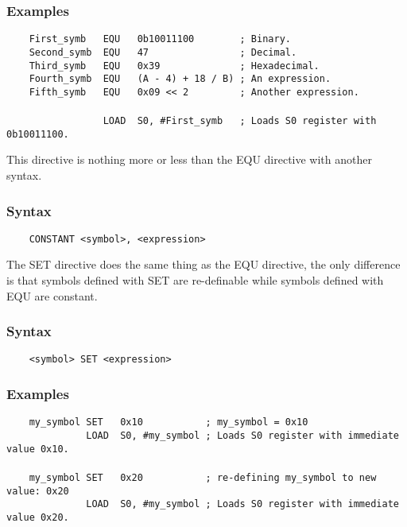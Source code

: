     \subsubsection{Examples}
        \verb'    First_symb   EQU   0b10011100        ; Binary.'\\
        \verb'    Second_symb  EQU   47                ; Decimal.'\\
        \verb'    Third_symb   EQU   0x39              ; Hexadecimal.'\\
        \verb'    Fourth_symb  EQU   (A - 4) + 18 / B) ; An expression.'\\
        \verb'    Fifth_symb   EQU   0x09 << 2         ; Another expression.'\\
        \verb''\\
        \verb'                 LOAD  S0, #First_symb   ; Loads S0 register with 0b10011100.'

    This directive is nothing more or less than the EQU directive with another syntax.

    \subsubsection{Syntax}
        \verb'    CONSTANT <symbol>, <expression>'

    The SET directive does the same thing as the EQU directive, the only difference is that symbols defined with SET are re-definable while symbols defined with EQU are constant.

    \subsubsection{Syntax}
        \verb'    <symbol> SET <expression>'

    \subsubsection{Examples}
        \verb'    my_symbol SET   0x10           ; my_symbol = 0x10'\\
        \verb'              LOAD  S0, #my_symbol ; Loads S0 register with immediate value 0x10.'\\
        \verb''\\
        \verb'    my_symbol SET   0x20           ; re-defining my_symbol to new value: 0x20'\\
        \verb'              LOAD  S0, #my_symbol ; Loads S0 register with immediate value 0x20.'

